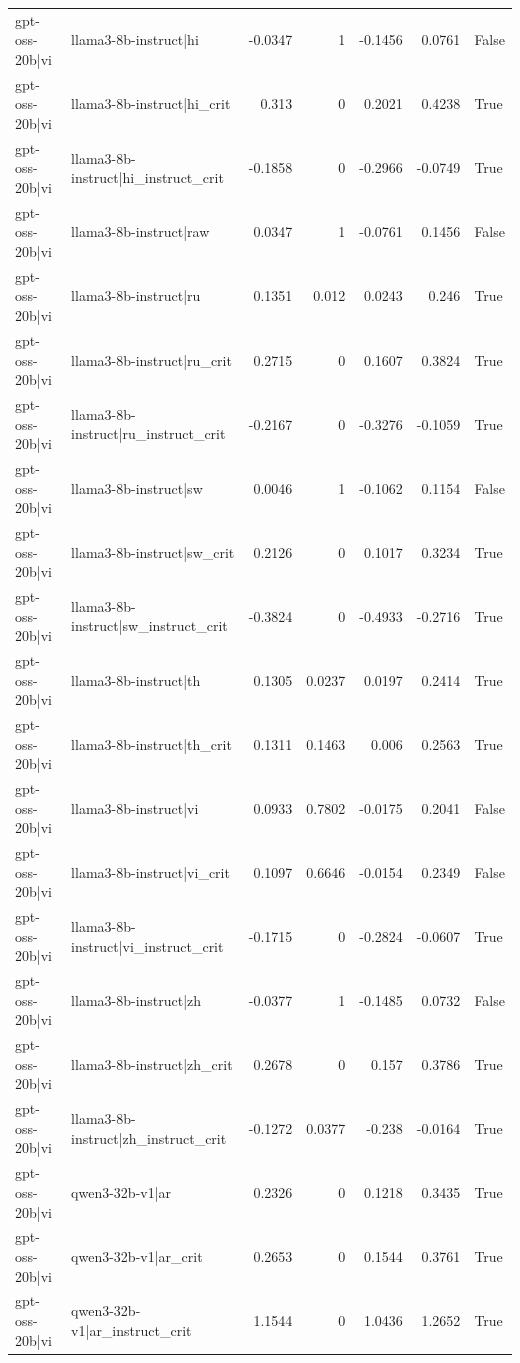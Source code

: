 \begin{table}
\begin{tabular}{l l r r r r l}
gpt-oss-20b|vi & llama3-8b-instruct|hi & -0.0347 & 1 & -0.1456 & 0.0761 & False \\
gpt-oss-20b|vi & llama3-8b-instruct|hi_crit & 0.313 & 0 & 0.2021 & 0.4238 & True \\
gpt-oss-20b|vi & llama3-8b-instruct|hi_instruct_crit & -0.1858 & 0 & -0.2966 & -0.0749 & True \\
gpt-oss-20b|vi & llama3-8b-instruct|raw & 0.0347 & 1 & -0.0761 & 0.1456 & False \\
gpt-oss-20b|vi & llama3-8b-instruct|ru & 0.1351 & 0.012 & 0.0243 & 0.246 & True \\
gpt-oss-20b|vi & llama3-8b-instruct|ru_crit & 0.2715 & 0 & 0.1607 & 0.3824 & True \\
gpt-oss-20b|vi & llama3-8b-instruct|ru_instruct_crit & -0.2167 & 0 & -0.3276 & -0.1059 & True \\
gpt-oss-20b|vi & llama3-8b-instruct|sw & 0.0046 & 1 & -0.1062 & 0.1154 & False \\
gpt-oss-20b|vi & llama3-8b-instruct|sw_crit & 0.2126 & 0 & 0.1017 & 0.3234 & True \\
gpt-oss-20b|vi & llama3-8b-instruct|sw_instruct_crit & -0.3824 & 0 & -0.4933 & -0.2716 & True \\
gpt-oss-20b|vi & llama3-8b-instruct|th & 0.1305 & 0.0237 & 0.0197 & 0.2414 & True \\
gpt-oss-20b|vi & llama3-8b-instruct|th_crit & 0.1311 & 0.1463 & 0.006 & 0.2563 & True \\
gpt-oss-20b|vi & llama3-8b-instruct|vi & 0.0933 & 0.7802 & -0.0175 & 0.2041 & False \\
gpt-oss-20b|vi & llama3-8b-instruct|vi_crit & 0.1097 & 0.6646 & -0.0154 & 0.2349 & False \\
gpt-oss-20b|vi & llama3-8b-instruct|vi_instruct_crit & -0.1715 & 0 & -0.2824 & -0.0607 & True \\
gpt-oss-20b|vi & llama3-8b-instruct|zh & -0.0377 & 1 & -0.1485 & 0.0732 & False \\
gpt-oss-20b|vi & llama3-8b-instruct|zh_crit & 0.2678 & 0 & 0.157 & 0.3786 & True \\
gpt-oss-20b|vi & llama3-8b-instruct|zh_instruct_crit & -0.1272 & 0.0377 & -0.238 & -0.0164 & True \\
gpt-oss-20b|vi & qwen3-32b-v1|ar & 0.2326 & 0 & 0.1218 & 0.3435 & True \\
gpt-oss-20b|vi & qwen3-32b-v1|ar_crit & 0.2653 & 0 & 0.1544 & 0.3761 & True \\
gpt-oss-20b|vi & qwen3-32b-v1|ar_instruct_crit & 1.1544 & 0 & 1.0436 & 1.2652 & True \\

\end{tabular}
\end{table}
